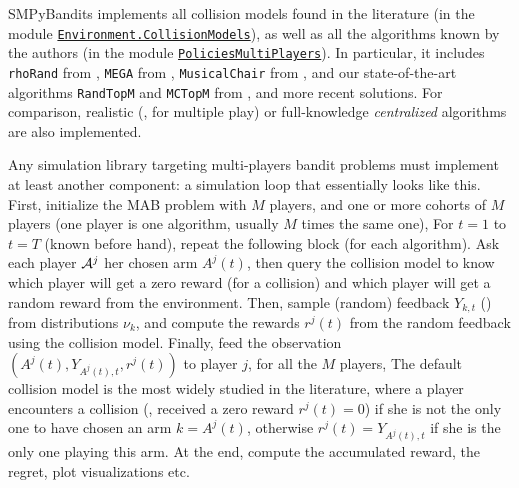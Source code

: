 SMPyBandits implements all collision models found in the literature (in the module \texttt{\href{https://SMPyBandits.GitHub.io/docs/Environment.CollisionModels.html}{Environment.CollisionModels}}), as well as all the algorithms known by the authors (in the module \texttt{\href{https://SMPyBandits.GitHub.io/docs/PoliciesMultiPlayers.html}{PoliciesMultiPlayers}}).
%
In particular, it includes
\texttt{rhoRand}
from \cite{Anandkumar11},
\texttt{MEGA}
from \cite{Avner15},
\texttt{MusicalChair}
from \cite{Rosenski16},
and our state-of-the-art algorithms
\texttt{RandTopM}
and \texttt{MCTopM}
from \cite{Besson2018ALT}, and more recent solutions.
For comparison, realistic (\eg, \UCB{} for multiple play) or full-knowledge \emph{centralized} algorithms are also implemented.

Any simulation library targeting multi-players bandit problems must implement at least another component:
a simulation loop that essentially looks like this.
    First, initialize the MAB problem with $M$ players, and one or more cohorts of $M$ players (one player is one algorithm, usually $M$ times the same one),
    For $t=1$ to $t=T$ (known before hand), repeat the following block (for each algorithm). Ask each player $\mathcal{A}^j$ her chosen arm $A^j(t)$, then query the collision model to know which player will get a zero reward (for a collision) and which player will get a random reward from the environment.
    Then, sample (random) feedback $Y_{k,t}$ (\iid) from distributions $\nu_{k}$, and compute the rewards $r^j(t)$ from the random feedback using the collision model.
    Finally, feed the observation $(A^j(t), Y_{A^j(t),t}, r^j(t))$ to player $j$, for all the $M$ players,
    The default collision model is the most widely studied in the literature, where a player encounters a collision (\ie, received a zero reward $r^j(t)=0$) if she is not the only one to have chosen an arm $k=A^j(t)$, otherwise $r^j(t)=Y_{A^j(t),t}$ if she is the only one playing this arm.
    At the end, compute the accumulated reward, the regret, plot visualizations etc.


